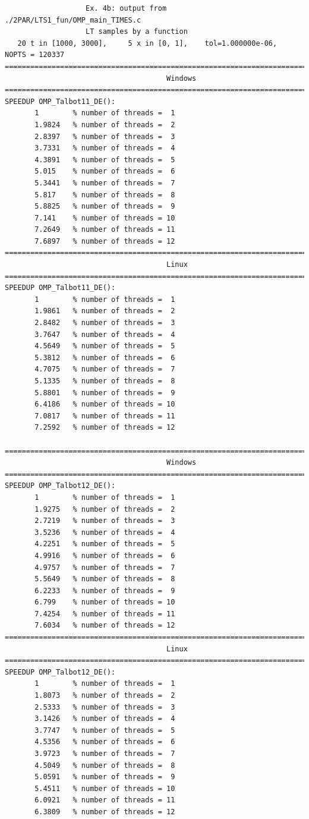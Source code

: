 \documentclass[a4paper,10pt]{report}%
\begin{document}
\newpage
\begin{lstlisting}
                   Ex. 4b: output from ./2PAR/LTS1_fun/OMP_main_TIMES.c
                   LT samples by a function
   20 t in [1000, 3000],     5 x in [0, 1],    tol=1.000000e-06,    NOPTS = 120337
====================================================================================
                                      Windows
====================================================================================
SPEEDUP OMP_Talbot11_DE():
       1        % number of threads =  1
       1.9824   % number of threads =  2
       2.8397   % number of threads =  3
       3.7331   % number of threads =  4
       4.3891   % number of threads =  5
       5.015    % number of threads =  6
       5.3441   % number of threads =  7
       5.817    % number of threads =  8
       5.8825   % number of threads =  9
       7.141    % number of threads = 10
       7.2649   % number of threads = 11
       7.6897   % number of threads = 12
====================================================================================
                                      Linux
====================================================================================
SPEEDUP OMP_Talbot11_DE():
       1        % number of threads =  1
       1.9861   % number of threads =  2
       2.8482   % number of threads =  3
       3.7647   % number of threads =  4
       4.5649   % number of threads =  5
       5.3812   % number of threads =  6
       4.7075   % number of threads =  7
       5.1335   % number of threads =  8
       5.8801   % number of threads =  9
       6.4186   % number of threads = 10
       7.0817   % number of threads = 11
       7.2592   % number of threads = 12

====================================================================================
                                      Windows
====================================================================================
SPEEDUP OMP_Talbot12_DE():
       1        % number of threads =  1
       1.9275   % number of threads =  2
       2.7219   % number of threads =  3
       3.5236   % number of threads =  4
       4.2251   % number of threads =  5
       4.9916   % number of threads =  6
       4.9757   % number of threads =  7
       5.5649   % number of threads =  8
       6.2233   % number of threads =  9
       6.799    % number of threads = 10
       7.4254   % number of threads = 11
       7.6034   % number of threads = 12
====================================================================================
                                      Linux
====================================================================================
SPEEDUP OMP_Talbot12_DE():
       1        % number of threads =  1
       1.8073   % number of threads =  2
       2.5333   % number of threads =  3
       3.1426   % number of threads =  4
       3.7747   % number of threads =  5
       4.5356   % number of threads =  6
       3.9723   % number of threads =  7
       4.5049   % number of threads =  8
       5.0591   % number of threads =  9
       5.4511   % number of threads = 10
       6.0921   % number of threads = 11
       6.3809   % number of threads = 12


\end{lstlisting}
\end{document}
